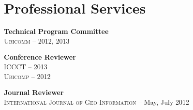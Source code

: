 \section{\sc Professional Services}
{\bf Technical Program Committee}\\
\textsc{Ubicomm} -- 2012, 2013

{\bf Conference Reviewer}\\
\textsc{ICCCT} -- 2013\\
\textsc{Ubicomp} -- 2012

{\bf Journal Reviewer}\\
\textsc{International Journal of Geo-Information} -- May, July 2012
